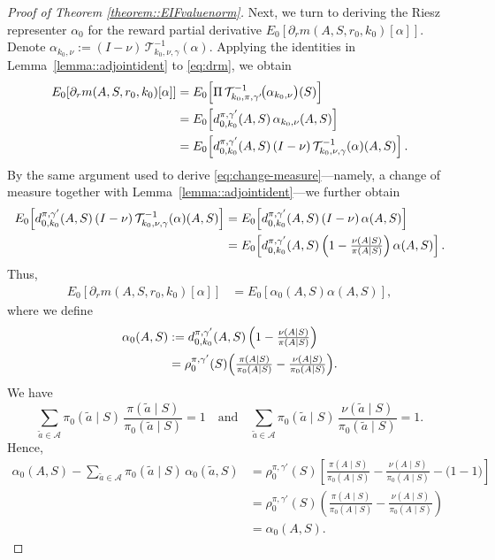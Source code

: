 \documentclass[11pt]{article}
\theoremstyle{plain}
\begin{document}
\begin{proof}[Proof of Theorem \ref{theorem::EIFvaluenorm}]
Next, we turn to deriving the Riesz representer $\alpha_0$ for the reward partial derivative 
$E_0[\partial_r m(A,S,r_0,k_0)[\alpha]]$. 
Denote $\alpha_{k_0,\nu} := (I - \nu)\,\mathcal{T}_{k_0,\nu,\gamma}^{-1}(\alpha)$. 
Applying the identities in Lemma~\ref{lemma::adjointident} to \eqref{eq:drm}, we obtain
\begin{align}
E_0[\partial_r m(A,S,r_0,k_0)[\alpha]] 
&= E_0\!\left[\Pi\,\mathcal{T}_{k_0,\pi,\gamma'}^{-1}\!\bigl(\alpha_{k_0,\nu}\bigr)(S)\right]\notag \\ 
&= E_0\!\left[d_{0,k_0}^{\pi,\gamma'}(A,S)\,\alpha_{k_0,\nu}(A,S)\right]\notag \\
&= E_0\!\left[d_{0,k_0}^{\pi,\gamma'}(A,S)\,(I - \nu)\,\mathcal{T}_{k_0,\nu,\gamma}^{-1}(\alpha)(A,S)\right].
\end{align}
By the same argument used to derive \eqref{eq:change-measure}---namely, a change of measure together with Lemma~\ref{lemma::adjointident}---we further obtain
\begin{align*}
E_0\!\left[d_{0,k_0}^{\pi,\gamma'}(A,S)\,(I - \nu)\,\mathcal{T}_{k_0,\nu,\gamma}^{-1}(\alpha)(A,S)\right] 
&= E_0\!\left[d_{0,k_0}^{\pi,\gamma'}(A,S)\,(I - \nu)\,\alpha(A,S)\right] \\
&= E_0\!\left[d_{0,k_0}^{\pi,\gamma'}(A,S)\,\Bigl(1 - \tfrac{\nu(A \mid S)}{\pi(A \mid S)}\Bigr)\,\alpha(A,S)\right].
\end{align*}
Thus,
\begin{align}
\label{eqnproof::normrewardderiv}
  E_0[\partial_r m(A,S,r_0,k_0)[\alpha]] 
&= E_0\!\left[\alpha_0(A,S)\alpha(A,S)\right],
\end{align}
where we define
\begin{align*}
\alpha_0(A,S) 
&:= d_{0,k_0}^{\pi,\gamma'}(A,S)\,\Bigl(1 - \tfrac{\nu(A \mid S)}{\pi(A \mid S)}\Bigr) \\
&= \rho_0^{\pi,\gamma'}(S)\Bigl(\tfrac{\pi(A \mid S)}{\pi_0(A \mid S)} - \tfrac{\nu(A \mid S)}{\pi_0(A \mid S)}\Bigr).
\end{align*}
We have
\[
\sum_{\tilde a\in\mathcal A}\pi_0(\tilde a\mid S)\,\frac{\pi(\tilde a\mid S)}{\pi_0(\tilde a\mid S)}=1
\quad\text{and}\quad
\sum_{\tilde a\in\mathcal A}\pi_0(\tilde a\mid S)\,\frac{\nu(\tilde a\mid S)}{\pi_0(\tilde a\mid S)}=1.
\]
Hence,
\begin{equation}
\label{eqn::proofalphaEIF}
\begin{aligned}
\alpha_0(A,S) - \sum_{\tilde a \in \mathcal{A}} \pi_0(\tilde a \mid S)\,\alpha_0(\tilde a, S) 
&= \rho_0^{\pi,\gamma'}(S)\left[\frac{\pi(A\mid S)}{\pi_0(A\mid S)}-\frac{\nu(A\mid S)}{\pi_0(A\mid S)}
 - \Big(1-1\Big)\right] \\
&= \rho_0^{\pi,\gamma'}(S)\left(\frac{\pi(A\mid S)}{\pi_0(A\mid S)}-\frac{\nu(A\mid S)}{\pi_0(A\mid S)}\right) \\
&= \alpha_0(A,S).
\end{aligned}
\end{equation}





\end{proof}
\end{document}
